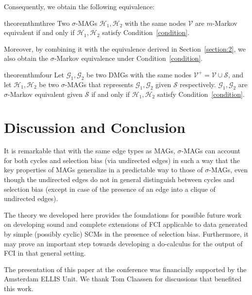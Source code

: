 \documentclass[accepted]{uai2025} %
\begin{document}
Consequently, we obtain the following equivalence:

\begin{restatable}{theorem}{thmthree} \label{thm3}
Two $\sigma$-MAGs $\mathcal{H}_1,\mathcal{H}_2$  with the same nodes $\mathcal{V}$ are $m$-Markov equivalent if and only if $\mathcal{H}_1,\mathcal{H}_2$ satisfy Condition~\ref{condition}.
\end{restatable}

Moreover, by combining it with the equivalence derived in Section~\ref{section:2}, we also obtain the $\sigma$-Markov equivalence under Condition~\ref{condition}.

\begin{restatable}{theorem}{thmfour} \label{thm4}
Let $\mathcal{G}_1,\mathcal{G}_2$ be two DMGs with the same nodes $\mathcal{V}^+=\mathcal{V}\cup \mathcal{S}$, and let $\mathcal{H}_1,\mathcal{H}_2$ be two $\sigma$-MAGs that represents $\mathcal{G}_1,\mathcal{G}_2$ given $\mathcal{S}$ respectively. $\mathcal{G}_1,\mathcal{G}_2$ are $\sigma$-Markov equivalent given $\mathcal{S}$ if and only if $\mathcal{H}_1,\mathcal{H}_2$ satisfy Condition~\ref{condition}.
\end{restatable}









\section{Discussion and Conclusion}

It is remarkable that with the same edge types as MAGs, $\sigma$-MAGs can account for both cycles and selection bias (via undirected edges) in such a way that the key properties of MAGs generalize in a predictable way to those of $\sigma$-MAGs, even though the undirected edges do not in general distinguish between cycles and selection bias (except in case of the presence of an edge into a clique of undirected edges).

The theory we developed here provides the foundations for possible future work on developing sound and complete extensions of FCI applicable to data generated by simple (possibly cyclic) SCMs in the presence of selection bias. Furthermore, it may prove an important step towards developing a do-calculus for the output of FCI in that general setting.



\begin{acknowledgements}
The presentation of this paper at the conference was financially supported by the Amsterdam ELLIS Unit.
We thank Tom Claassen for discussions that benefited this work.
\end{acknowledgements}
\end{document}
